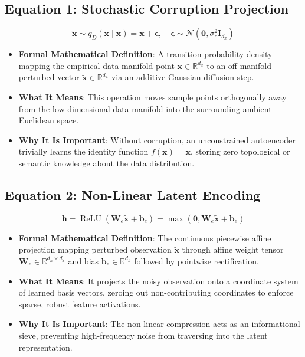 \documentclass[11pt,a4paper]{article}
\theoremstyle{definition}
\begin{document}
\subsection{\textbf{Equation 1: Stochastic Corruption Projection}}
{\boldmath
\begin{equation}
\tilde{\mathbf{x}} \sim q_D(\tilde{\mathbf{x}} \mid \mathbf{x}) = \mathbf{x} + \boldsymbol{\epsilon}, \quad \boldsymbol{\epsilon} \sim \mathcal{N}(\mathbf{0}, \sigma_\epsilon^2 \mathbf{I}_{d_x})
\end{equation}
}
\begin{itemize}
    \item \textbf{Formal Mathematical Definition}:
    A transition probability density mapping the empirical data manifold point $\mathbf{x} \in \mathbb{R}^{d_x}$ to an off-manifold perturbed vector $\tilde{\mathbf{x}} \in \mathbb{R}^{d_x}$ via an additive Gaussian diffusion step.
    \item \textbf{What It Means}:
    This operation moves sample points orthogonally away from the low-dimensional data manifold into the surrounding ambient Euclidean space.
    \item \textbf{Why It Is Important}:
    Without corruption, an unconstrained autoencoder trivially learns the identity function $f(\mathbf{x}) = \mathbf{x}$, storing zero topological or semantic knowledge about the data distribution.
\end{itemize}

\subsection{\textbf{Equation 2: Non-Linear Latent Encoding}}
{\boldmath
\begin{equation}
\mathbf{h} = \operatorname{ReLU}(\mathbf{W}_e \tilde{\mathbf{x}} + \mathbf{b}_e) = \max(\mathbf{0}, \mathbf{W}_e \tilde{\mathbf{x}} + \mathbf{b}_e)
\end{equation}
}
\begin{itemize}
    \item \textbf{Formal Mathematical Definition}:
    The continuous piecewise affine projection mapping perturbed observation $\tilde{\mathbf{x}}$ through affine weight tensor $\mathbf{W}_e \in \mathbb{R}^{d_h \times d_x}$ and bias $\mathbf{b}_e \in \mathbb{R}^{d_h}$ followed by pointwise rectification.
    \item \textbf{What It Means}:
    It projects the noisy observation onto a coordinate system of learned basis vectors, zeroing out non-contributing coordinates to enforce sparse, robust feature activations.
    \item \textbf{Why It Is Important}:
    The non-linear compression acts as an informational sieve, preventing high-frequency noise from traversing into the latent representation.
\end{itemize}
\end{document}
